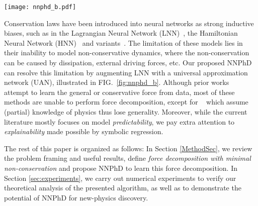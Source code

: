 \documentclass[aps,pre,reprint,superscriptaddress,nofootinbib,amsmath,amssymb]{revtex4-2}
\begin{document}
\twocolumngrid

\begin{figure*}[htbp]
	\centering
	\texttt{[image: nnphd\_b.pdf]}
	\vskip 0.5cm
	\caption{NNPhD predicts dynamics by decomposing the force into conservative and non-conservative components, which can reveal new physics and improve trajectory extrapolation.}
	\label{fig:nnphd_b}
	\vskip -0.3cm
\end{figure*}



Conservation laws have been introduced into neural networks as strong inductive biases, such as in the Lagrangian Neural Network (LNN)~\cite{cranmer2020lagrangian}, the Hamiltonian Neural Network (HNN)~\cite{greydanus2019hamiltonian} and variants~\cite{finzi2020simplifying, choudhary2020forecasting,jin2020sympnets, HGN}. The limitation of these models lies in their inability to model non-conservative dynamics, where the non-conservation can be caused by dissipation, external driving forces, etc. Our proposed NNPhD can resolve this limitation by augmenting LNN with a universal approximation network (UAN), illustrated in FIG.~\ref{fig:nnphd_b}. Although prior works~\cite{long2018pde,chen2018neural,battaglia2016interaction,NEURIPS2019_b2945042,PhysRevX.10.031056,champion2019data,udrescu2020symbolic,kim2019integration,raissi2019physics,cranmer2020lagrangian,greydanus2019hamiltonian,matsubara2019deep,cranmer2020discovering,Raissi1026,PhysRevE.100.033311,PhysRevX.10.021020,lutter2019deep, cranmer2020lagrangian, finzi2020simplifying, greydanus2019hamiltonian, choudhary2020forecasting,jin2020sympnets, HGN, poincare,welch1995introduction, guen2020augmenting,ajay2018augmenting,wu2015galileo,zhong2020dissipative} attempt to learn the general or conservative force from data, most of these methods are unable to perform force decomposition, except for ~\cite{ guen2020augmenting,zhong2020dissipative} which assume (partial) knowledge of physics thus lose generality. Moreover, while the current literature mostly focuses on model \textit{predictability}, we pay extra attention to \textit{explainability} made possible by symbolic regression.



The rest of this paper is organized as follows: In Section \ref{MethodSec}, we review the problem framing and useful results, define {\it force decomposition with minimal non-conservation} and propose NNPhD to learn this force decomposition. In Section \ref{sec:experiments}, we carry out numerical experiments to verify our theoretical analysis of the presented algorithm, as well as to demonstrate the potential of NNPhD for new-physics discovery.
\end{document}
